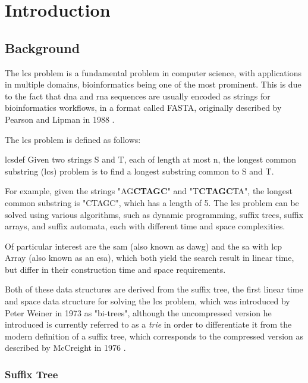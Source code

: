 \chapter{Introduction}


\section{Background}
The \acrfull{lcs} problem is a fundamental problem in computer science, with applications in multiple domains, bioinformatics being one of the most prominent.
This is due to the fact that \gls{dna} and \gls{rna} sequences are usually encoded as strings for bioinformatics workflows, in a format called FASTA, originally described by Pearson and Lipman in 1988 \cite{pearson}.

The \acrshort{lcs} problem is defined as follows: 
\begin{displaycquote}{lcsdef}
  Given two strings S and T, each of length at most n, the longest common substring (\acrshort{lcs}) problem is to find a longest substring common to S and T.  
\end{displaycquote}
For example, given the strings "AG\textbf{CTAGC}" and "T\textbf{CTAGC}TA", the longest common substring is "CTAGC", which has a length of 5.
The \acrshort{lcs} problem can be solved using various algorithms, such as dynamic programming, suffix trees, suffix arrays, and suffix automata, each with different time and space complexities.

Of particular interest are the \acrfull{sam} (also known as \acrfull{dawg}) and the \acrfull{sa} with \acrfull{lcp} Array (also known as an \acrfull{esa}), 
which both yield the search result in linear time, but differ in their construction time and space requirements.

Both of these data structures are derived from the suffix tree, the first linear time and space data structure for solving the \acrshort{lcs} problem, 
which was introduced by Peter Weiner in 1973 \cite{weiner} as "bi-trees", although the uncompressed version he introduced is 
currently referred to as a \textit{trie} in order to differentiate it from the modern definition of a suffix tree, 
which corresponds to the compressed version as described by McCreight in 1976 \cite{stdef}.

\subsection{Suffix Tree}

